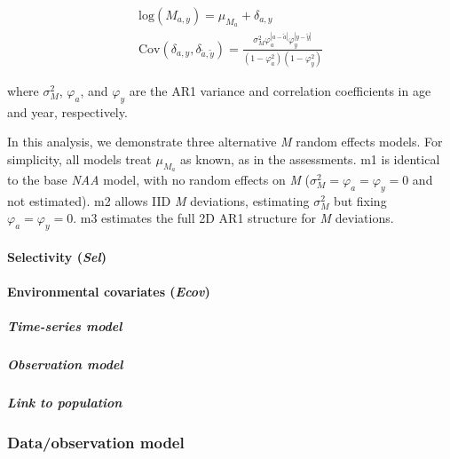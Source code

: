 \documentclass[]{article}
\let\oldparagraph\paragraph
\renewcommand{\paragraph}[1]{\oldparagraph{#1}\mbox{}}
\let\oldsubparagraph\subparagraph
\renewcommand{\subparagraph}[1]{\oldsubparagraph{#1}\mbox{}}
\begin{document}
\begin{equation}
  \begin{array}{cc}
    \text{log}\left( M_{a,y} \right) = \mu_{M_a} + \delta_{a,y} \\
    \text{Cov} \left( \delta_{a,y}, \delta_{\tilde{a},\tilde{y}} \right) = \frac{\sigma^2_M \varphi^{|a-\tilde{a}|}_{a} \varphi^{|y-\tilde{y}|}_{y}}{\left(1-\varphi^2_{a}\right) \left(1-\varphi^2_{y}\right)}
  \end{array}
\end{equation}

where \(\sigma^2_M\), \(\varphi_a\), and \(\varphi_y\) are the AR1
variance and correlation coefficients in age and year, respectively.

In this analysis, we demonstrate three alternative \emph{M} random
effects models. For simplicity, all models treat \(\mu_{M_a}\) as known,
as in the assessments. m1 is identical to the base \emph{NAA} model,
with no random effects on \emph{M}
(\(\sigma^2_M = \varphi_a = \varphi_y = 0\) and not estimated). m2
allows IID \emph{M} deviations, estimating \(\sigma^2_M\) but fixing
\(\varphi_a = \varphi_y = 0\). m3 estimates the full 2D AR1 structure
for \emph{M} deviations.

\hypertarget{selectivity-sel}{%
\paragraph{\texorpdfstring{Selectivity
(\emph{Sel})}{Selectivity (Sel)}}\label{selectivity-sel}}

\hypertarget{environmental-covariates-ecov}{%
\paragraph{\texorpdfstring{Environmental covariates
(\emph{Ecov})}{Environmental covariates (Ecov)}}\label{environmental-covariates-ecov}}

\hypertarget{time-series-model}{%
\subparagraph{Time-series model}\label{time-series-model}}

\hypertarget{observation-model}{%
\subparagraph{Observation model}\label{observation-model}}

\hypertarget{link-to-population}{%
\subparagraph{Link to population}\label{link-to-population}}

\hypertarget{dataobservation-model}{%
\subsubsection{Data/observation model}\label{dataobservation-model}}
\end{document}
